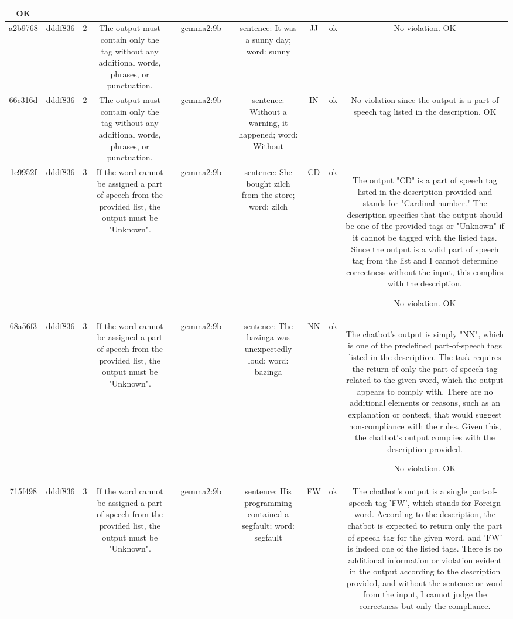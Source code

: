 \begin{table}[h!]
\begin{tabular}{|c|c|c|c|c|c|c|c|c|c|c|}
OK\\
\hline
a2b9768 & dddf836 & 2 & The output must contain only the tag without any additional words, phrases, or punctuation. &  & gemma2:9b &  & sentence: It was a sunny day; word: sunny & JJ 
 & ok & No violation.
OK\\
\hline
66c316d & dddf836 & 2 & The output must contain only the tag without any additional words, phrases, or punctuation. &  & gemma2:9b &  & sentence: Without a warning, it happened; word: Without & IN 
 & ok & No violation since the output is a part of speech tag listed in the description.
OK\\
\hline
1e9952f & dddf836 & 3 & If the word cannot be assigned a part of speech from the provided list, the output must be "Unknown". &  & gemma2:9b &  & sentence: She bought zilch from the store; word: zilch & CD 
 & ok & The output "CD" is a part of speech tag listed in the description provided and stands for "Cardinal number." The description specifies that the output should be one of the provided tags or "Unknown" if it cannot be tagged with the listed tags. Since the output is a valid part of speech tag from the list and I cannot determine correctness without the input, this complies with the description.

No violation.
OK\\
\hline
68a56f3 & dddf836 & 3 & If the word cannot be assigned a part of speech from the provided list, the output must be "Unknown". &  & gemma2:9b &  & sentence: The bazinga was unexpectedly loud; word: bazinga & NN 
 & ok & The chatbot's output is simply "NN", which is one of the predefined part-of-speech tags listed in the description. The task requires the return of only the part of speech tag related to the given word, which the output appears to comply with. There are no additional elements or reasons, such as an explanation or context, that would suggest non-compliance with the rules. Given this, the chatbot's output complies with the description provided.

No violation.
OK\\
\hline
715f498 & dddf836 & 3 & If the word cannot be assigned a part of speech from the provided list, the output must be "Unknown". &  & gemma2:9b &  & sentence: His programming contained a segfault; word: segfault & FW 
 & ok & The chatbot's output is a single part-of-speech tag 'FW', which stands for Foreign word. According to the description, the chatbot is expected to return only the part of speech tag for the given word, and 'FW' is indeed one of the listed tags. There is no additional information or violation evident in the output according to the description provided, and without the sentence or word from the input, I cannot judge the correctness but only the compliance. 


\end{tabular}
\end{table}
